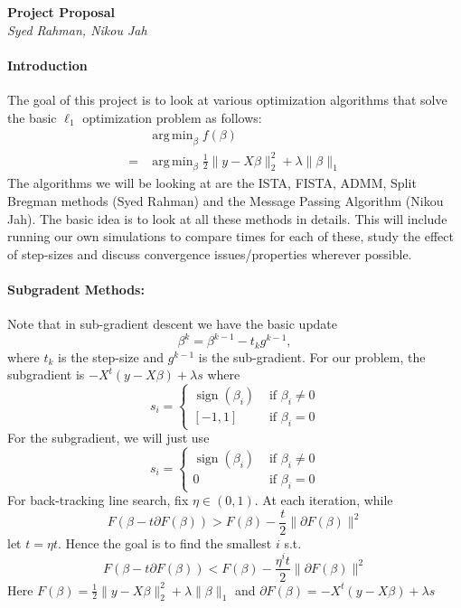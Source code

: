 \documentclass[12pt, leqno]{article}
\providecommand{\norm}[1]{\lVert#1\rVert} %
\DeclareMathOperator*{\argmin}{arg\,min}
\DeclareMathOperator*{\sign}{sign}
\begin{document}
\pagestyle{fancy}

\begin{center}
{\large {\bf Project Proposal}} \\
{{\it Syed Rahman, Nikou Jah}} \\
\end{center}

\paragraph{Introduction} The goal of this project is to look at various
optimization algorithms that solve the basic $\ell_1$ optimization
problem as follows:
\begin{align}
\label{eq:lasso}
& \argmin_{\beta} f(\beta) \\ 
\nonumber 
=& \argmin_{\beta} \frac{1}{2}\norm{y- X \beta}_2^2 + \lambda \norm{\beta}_1
\end{align}
The algorithms we will be looking at are the ISTA, FISTA, ADMM, Split
Bregman methods (Syed Rahman) and the Message Passing Algorithm (Nikou Jah). The
basic idea is to look at all these methods in details. This will include running our own simulations to compare times
for each of these, study the effect of step-sizes and discuss convergence issues/properties wherever possible.

\paragraph{Subgradent Methods:} Note that in  sub-gradient descent we have the basic update $$\beta^k = \beta^{k-1} - t_k g^{k-1},$$ 
where $t_k$ is the step-size and $g^{k-1}$ is the sub-gradient. For our problem, the subgradient is $-X^t(y-X\beta) + \lambda s$ where 
$$
s_i = \begin{cases}
\sign(\beta_i) &\text{ if } \beta_i \neq 0\\
[-1,1] &\text{ if } \beta_i = 0
\end{cases}
$$
For the subgradient, we will just use
$$
s_i = \begin{cases}
\sign(\beta_i) &\text{ if } \beta_i \neq 0\\
0 &\text{ if } \beta_i = 0
\end{cases}
$$
For back-tracking line search, fix $\eta \in (0,1)$. At each iteration, while 
$$
F(\beta - t \partial F(\beta)) > F(\beta) - \frac{t}{2} \norm{\partial F(\beta)}^2
$$
let $t = \eta t$. Hence the goal is to find the smallest $i$ s.t. $$
F(\beta - t \partial F(\beta)) < F(\beta) - \frac{\eta^i t}{2} \norm{\partial F(\beta)}^2
$$ 
Here $F(\beta) = \frac{1}{2}\norm{y- X \beta}_2^2 + \lambda \norm{\beta}_1$ and $\partial F(\beta) = -X^t(y-X\beta) + \lambda s$
\end{document}
